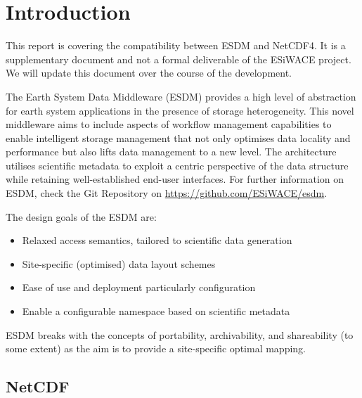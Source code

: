\chapter{Introduction}
\label{ch:intro}

This report is covering the compatibility between ESDM and NetCDF4. It is a supplementary document and not a formal deliverable of the ESiWACE project. We will update this document over the course of the development.

The Earth System Data Middleware (ESDM) provides a high level of abstraction for earth system applications in the presence of storage heterogeneity. This novel middleware aims to include aspects of workflow management capabilities to enable intelligent storage management that not only optimises data locality and performance but also lifts data management to a new level. The architecture utilises scientific metadata to exploit a centric perspective of the data structure while retaining well-established end-user interfaces. For further information on ESDM, check the Git Repository on \url{https://github.com/ESiWACE/esdm}.

The design goals of the ESDM are:

\begin{itemize}

\item Relaxed access semantics, tailored to scientific data generation

\item Site-specific (optimised) data layout schemes

\item Ease of use and deployment particularly configuration

\item Enable a configurable namespace based on scientific metadata

\end{itemize}

ESDM breaks with the concepts of portability, archivability, and shareability (to some extent) as the aim is to provide a site-specific optimal mapping.

\section{NetCDF}

